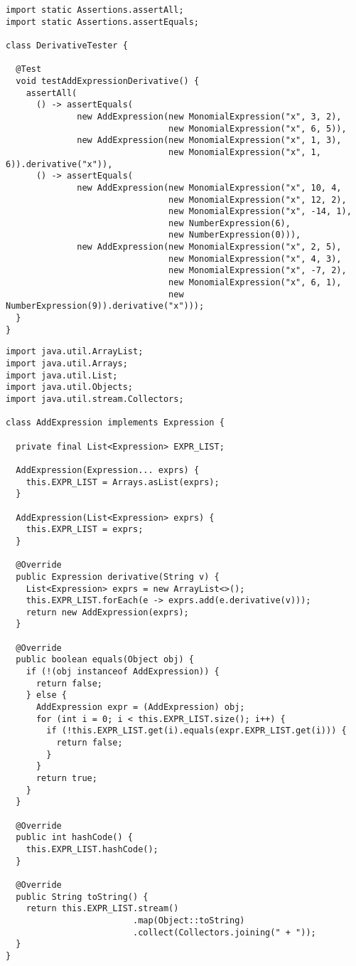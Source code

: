 \begin{lstlisting}[language=MyJava]
import static Assertions.assertAll;
import static Assertions.assertEquals;
  
class DerivativeTester {

  @Test
  void testAddExpressionDerivative() {
    assertAll(
      () -> assertEquals(
              new AddExpression(new MonomialExpression("x", 3, 2),
                                new MonomialExpression("x", 6, 5)),
              new AddExpression(new MonomialExpression("x", 1, 3),
                                new MonomialExpression("x", 1, 6)).derivative("x")),
      () -> assertEquals(
              new AddExpression(new MonomialExpression("x", 10, 4,
                                new MonomialExpression("x", 12, 2),
                                new MonomialExpression("x", -14, 1),
                                new NumberExpression(6),
                                new NumberExpression(0))),
              new AddExpression(new MonomialExpression("x", 2, 5),
                                new MonomialExpression("x", 4, 3),
                                new MonomialExpression("x", -7, 2),
                                new MonomialExpression("x", 6, 1),
                                new NumberExpression(9)).derivative("x")));
  }
}
\end{lstlisting}

\begin{lstlisting}[language=MyJava]
import java.util.ArrayList;
import java.util.Arrays;
import java.util.List;
import java.util.Objects;
import java.util.stream.Collectors;

class AddExpression implements Expression {

  private final List<Expression> EXPR_LIST;

  AddExpression(Expression... exprs) {
    this.EXPR_LIST = Arrays.asList(exprs);
  }

  AddExpression(List<Expression> exprs) { 
    this.EXPR_LIST = exprs; 
  }

  @Override
  public Expression derivative(String v) {
    List<Expression> exprs = new ArrayList<>();
    this.EXPR_LIST.forEach(e -> exprs.add(e.derivative(v)));
    return new AddExpression(exprs);
  }

  @Override
  public boolean equals(Object obj) {
    if (!(obj instanceof AddExpression)) { 
      return false; 
    } else { 
      AddExpression expr = (AddExpression) obj;
      for (int i = 0; i < this.EXPR_LIST.size(); i++) {
        if (!this.EXPR_LIST.get(i).equals(expr.EXPR_LIST.get(i))) { 
          return false; 
        }
      }
      return true;
    }
  }

  @Override
  public int hashCode() { 
    this.EXPR_LIST.hashCode(); 
  }

  @Override
  public String toString() { 
    return this.EXPR_LIST.stream()
                         .map(Object::toString)
                         .collect(Collectors.joining(" + "));
  }
}
\end{lstlisting}

